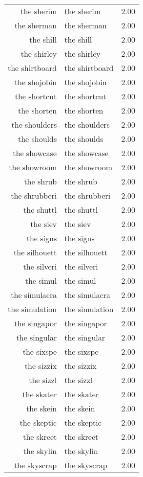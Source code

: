 \begin{table}[ht]
\begin{tabular}{rlr}
  the sherim & the sherim & 2.00 \\ 
  the sherman & the sherman & 2.00 \\ 
  the shill & the shill & 2.00 \\ 
  the shirley & the shirley & 2.00 \\ 
  the shirtboard & the shirtboard & 2.00 \\ 
  the shojobin & the shojobin & 2.00 \\ 
  the shortcut & the shortcut & 2.00 \\ 
  the shorten & the shorten & 2.00 \\ 
  the shoulders & the shoulders & 2.00 \\ 
  the shoulds & the shoulds & 2.00 \\ 
  the showcase & the showcase & 2.00 \\ 
  the showroom & the showroom & 2.00 \\ 
  the shrub & the shrub & 2.00 \\ 
  the shrubberi & the shrubberi & 2.00 \\ 
  the shuttl & the shuttl & 2.00 \\ 
  the siev & the siev & 2.00 \\ 
  the signs & the signs & 2.00 \\ 
  the silhouett & the silhouett & 2.00 \\ 
  the silveri & the silveri & 2.00 \\ 
  the simul & the simul & 2.00 \\ 
  the simulacra & the simulacra & 2.00 \\ 
  the simulation & the simulation & 2.00 \\ 
  the singapor & the singapor & 2.00 \\ 
  the singular & the singular & 2.00 \\ 
  the sixspe & the sixspe & 2.00 \\ 
  the sizzix & the sizzix & 2.00 \\ 
  the sizzl & the sizzl & 2.00 \\ 
  the skater & the skater & 2.00 \\ 
  the skein & the skein & 2.00 \\ 
  the skeptic & the skeptic & 2.00 \\ 
  the skreet & the skreet & 2.00 \\ 
  the skylin & the skylin & 2.00 \\ 
  the skyscrap & the skyscrap & 2.00 \\ 

\end{tabular}
\end{table}
